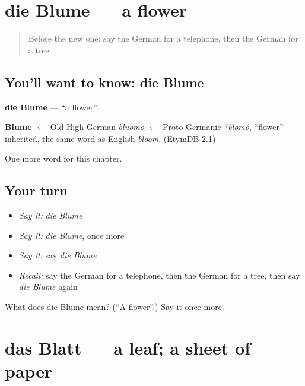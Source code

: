 \section[die Blume]{die Blume — a flower}

\label{lesson:GE-C82-blume}



\begin{quote}
Before the new one: say the German for a telephone, then the German for a tree.
\end{quote}

\subsection*{You'll want to know: die Blume}
\textbf{die Blume} — \textquotedblleft{}a flower\textquotedblright{}.

\begin{cousinweb}
\textbf{Blume} $\leftarrow$ Old High German \emph{bluomo} $\leftarrow$ Proto-Germanic \emph{*blōmô}, \textquotedblleft{}flower\textquotedblright{} — inherited, the same word as English \emph{bloom}. (EtymDB 2.1)
\end{cousinweb}

\begin{grammarlens}[title={What you've built}]
One more word for this chapter.
\end{grammarlens}

\subsection*{Your turn}
\begin{itemize}
\raggedright
  \item \emph{Say it:} \emph{die Blume}
  \item \emph{Say it:} \emph{die Blume}, once more
  \item \emph{Say it:} say \emph{die Blume}
  \item \emph{Recall:} say the German for a telephone, then the German for a tree, then say \emph{die Blume} again
\end{itemize}

\begin{tcolorbox}[breakable,colback=teal!4,colframe=teal!35!black,title={Before you move on}]
What does die Blume mean? (\textquotedblleft{}A flower\textquotedblright{}.) Say it once more.
\end{tcolorbox}
\section[das Blatt]{das Blatt — a leaf; a sheet of paper}

